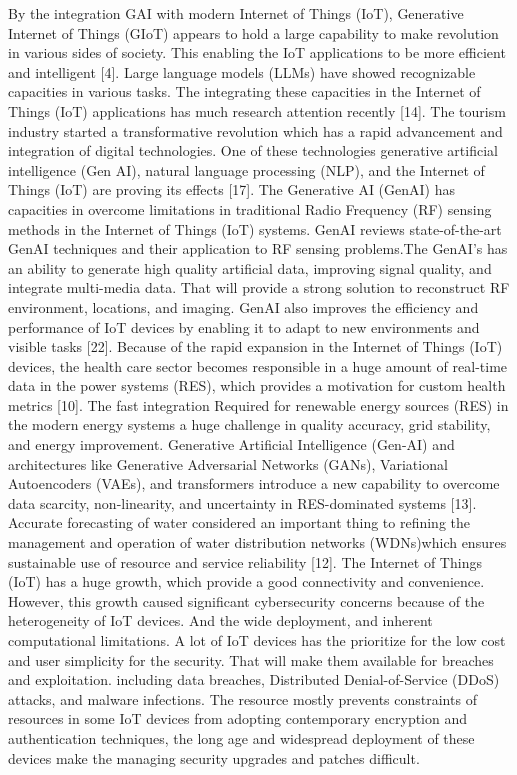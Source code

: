 \documentclass[journal]{IEEEtran}
\begin{document}
By the integration GAI with modern Internet of Things (IoT), Generative Internet of Things (GIoT) appears to hold a large capability to make revolution in various sides of society. This enabling the IoT applications to be more efficient and intelligent [4]. Large language models (LLMs) have showed recognizable capacities in various tasks. The integrating these capacities in the Internet of Things (IoT) applications has much research attention recently [14]. The tourism industry started a transformative revolution which has a rapid advancement and integration of digital technologies. One of these technologies generative artificial intelligence (Gen AI), natural language processing (NLP), and the Internet of Things (IoT) are proving its effects [17]. The Generative AI (GenAI) has capacities in overcome limitations in traditional Radio Frequency (RF) sensing methods in the Internet of Things (IoT) systems. GenAI reviews state-of-the-art GenAI techniques and their application to RF sensing problems.The GenAI's has an ability to generate high quality artificial data, improving signal quality, and integrate multi-media data. That will provide a strong solution to reconstruct RF environment, locations, and imaging. GenAI also improves the efficiency and performance of IoT devices by enabling it to adapt to new environments and visible tasks [22].
Because of the rapid expansion in the Internet of Things (IoT) devices, the health care sector becomes responsible in a huge amount of real-time data in the power systems (RES), which provides a motivation for custom health metrics [10]. The fast integration Required for renewable energy sources (RES) in the modern energy systems a huge challenge in quality accuracy, grid stability, and energy improvement. Generative Artificial Intelligence (Gen-AI) and architectures like Generative Adversarial Networks (GANs), Variational Autoencoders (VAEs), and transformers introduce a new capability to overcome data scarcity, non-linearity, and uncertainty in RES-dominated systems [13]. Accurate forecasting of water considered an important thing to refining the management and operation of water distribution networks (WDNs)which ensures sustainable use of resource and service reliability [12].
The Internet of Things (IoT) has a huge growth, which provide a good connectivity and convenience. However, this growth caused significant cybersecurity concerns because of the heterogeneity of IoT devices. And the wide deployment, and inherent computational limitations. A lot of IoT devices has the prioritize for the low cost and user simplicity for the security. That will make them available for breaches and exploitation. including data breaches, Distributed Denial-of-Service (DDoS) attacks, and malware infections. The resource mostly prevents constraints of resources in some IoT devices from adopting contemporary encryption and authentication techniques, the long age and widespread deployment of these devices make the managing security upgrades and patches difficult.
\end{document}
